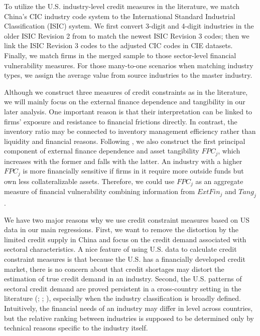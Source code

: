 \documentclass[12pt]{article}
\begin{document}
To utilize the U.S. industry-level credit measures in the literature, we match China's CIC industry code system to the International Standard Industrial Classification (ISIC) system. We first convert 3-digit and 4-digit industries in the older ISIC Revision 2 from \cite{manova-wei-zhang2015} to match the newest ISIC Revision 3 codes; then we link the ISIC Revision 3 codes to the adjusted CIC codes in CIE datasets. Finally, we match firms in the merged sample to those sector-level financial vulnerability measures. For those many-to-one scenarios when matching industry types, we assign the average value from source industries to the master industry.

Although we construct three measures of credit constraints as in the literature, we will mainly focus on the external finance dependence and tangibility in our later analysis. One important reason is that their interpretation can be linked to firms' exposure and resistance to financial frictions directly. In contrast, the inventory ratio may be connected to inventory management efficiency rather than liquidity and financial reasons. Following \cite{manova-wei-zhang2015}, we also construct the first principal component of external finance dependence and asset tangibility $FPC_j$, which increases with the former and falls with the latter. An industry with a higher $FPC_j$ is more financially sensitive if firms in it require more outside funds but own less collateralizable assets. Therefore, we could use $FPC_j$ as an aggregate measure of financial vulnerability combining information from $ExtFin_j$ and $Tang_j$.

We have two major reasons why we use credit constraint measures based on US data in our main regressions. First, we want to remove the distortion by the limited credit supply in China and focus on the credit demand associated with sectoral characteristics. A nice feature of using U.S. data to calculate credit constraint measures is that because the U.S. has a financially developed credit market, there is no concern about that credit shortages may distort the estimation of true credit demand in an industry. Second, the U.S. patterns of sectoral credit demand are proved persistent in a cross-country setting in the literature (\cite{kroszner2007}; \cite{manova-wei-zhang2015}; \cite{fan-lai-li2015}), especially when the industry classification is broadly defined. Intuitively, the financial needs of an industry may differ in level across countries, but the relative ranking between industries is supposed to be determined only by technical reasons specific to the industry itself.
\end{document}
